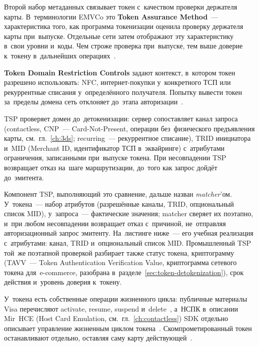 Второй набор метаданных связывает токен с~качеством проверки держателя карты.
В~терминологии EMVCo это \textbf{Token Assurance Method}~--- характеристика
того, как программа токенизации оценила проверку держателя карты при~выпуске.
Отдельные сети затем отображают эту характеристику в~свои уровни и~коды. Чем
строже проверка при~выпуске, тем выше доверие к~токену в~дальнейших
операциях~\cite{emvco-payment-tokenisation-guide}.

\textbf{Token Domain Restriction Controls} задают контекст, в~котором токен
разрешено использовать: NFC, интернет-покупки у~конкретного ТСП или
рекуррентные списания у~определённого получателя. Попытку вывести токен
за~пределы домена сеть отклоняет до~этапа
авторизации~\cite{emvco-payment-tokenisation,emvco-payment-tokenisation-guide}.

TSP проверяет домен до~детокенизации: сервер
сопоставляет канал запроса (contactless, CNP~--- Card-Not-Present, операции
  без~физического предъявления карты, см.~гл.~\ref{ch:3ds}; recurring~---
рекуррентное списание), TRID инициатора и~MID (Merchant ID, идентификатор ТСП
в~эквайринге) с~атрибутами ограничения, записанными при~выпуске токена. При
несовпадении TSP возвращает отказ на~шаге маршрутизации, до~того как запрос
дойдёт до~эмитента.

Компонент TSP, выполняющий это сравнение, дальше назван
\textit{matcher}'ом. У~токена~--- набор атрибутов (разрешённые каналы, TRID,
опциональный список MID), у~запроса~--- фактические значения; matcher сверяет
их поэтапно, и~при любом несовпадении возвращает отказ с~причиной, не~отправляя
авторизационный запрос эмитенту. На~листинге ниже~--- его учебная реализация
с~атрибутами: канал, TRID и~опциональный список MID. Промышленный TSP
той~же поэтапной проверкой разбирает также статус токена, криптограмму
(TAVV~--- Token Authentication Verification Value, криптограмма сетевого токена
для~e-commerce, разобрана в~разделе~\ref{sec:token-detokenization}), срок
действия и~уровень доверия к~токену.


У~токена есть собственные операции жизненного цикла: публичные материалы Visa
перечисляют activate, resume, suspend и~delete~\cite{visa-vts}, а~НСПК
в~описании Mir~HCE (Host Card Emulation, см.~гл.~\ref{ch:contactless}) SDK
отдельно описывает управление жизненным циклом
токена~\cite{nspk-tsp}. Скомпрометированный токен останавливают отдельно,
оставляя саму карту действующей~\cite{emvco-payment-tokenisation}.

